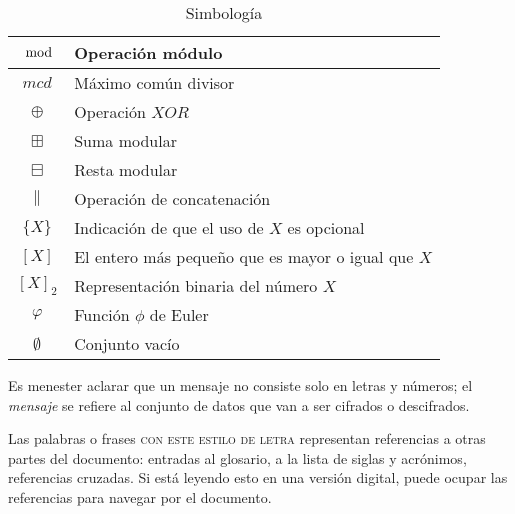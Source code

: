 \begin{table}[H]
\begin{center}
\begin{tabular}{c|l}
      \hline
      $\mod$ & Operación módulo \\
      \hline
      $mcd$ & Máximo común divisor \\
      \hline
      $\oplus$ & Operación $XOR$ \\
      \hline
      $\boxplus$ & Suma modular \\
      \hline
      $\boxminus$ & Resta modular \\
      \hline
      $\parallel$ & Operación de concatenación \\
      \hline
      $\{X\}$ & Indicación de que el uso de $X$ es opcional \\
      \hline
      $[X]$ & El entero más pequeño que es mayor o igual que $X$ \\
      \hline
      $[X]_2$ & Representación binaria del número $X$ \\
      \hline
      $\varphi$ & Función $\phi$ de Euler \\
      \hline
      $\emptyset$ & Conjunto vacío \\
      \hline
    \end{tabular}
    \caption{Simbología}\label{tab:simb}
  \end{center}
\end{table}

Es menester aclarar que un mensaje no consiste solo en letras y números;
el \textit{mensaje} se refiere al conjunto de datos que van a ser
cifrados o descifrados.

Las palabras o frases \textsc{con este estilo de letra} representan
referencias a otras partes del documento: entradas al glosario, a la lista de
siglas y acrónimos, referencias cruzadas. Si está leyendo esto en una
versión digital, puede ocupar las referencias para navegar por el documento.
